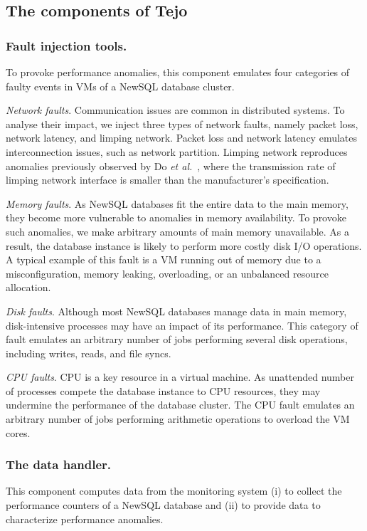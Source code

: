 \subsection{The components of Tejo}
\label{subsec:tejo_components}

\subsubsection{Fault injection tools.} 
To provoke performance anomalies, this component emulates four categories of faulty events in VMs of a NewSQL database cluster. 

\emph{Network faults}. Communication issues are common in distributed systems. To analyse their impact, we inject three types of network faults, namely packet loss, network latency, and limping network. Packet loss and network latency emulates interconnection issues, such as network partition. Limping network reproduces anomalies previously observed by Do \emph{et al.}~\cite{do2013limplock}, where the transmission rate of limping network interface is smaller than the manufacturer's specification. 

\emph{Memory faults}. As NewSQL databases fit the entire data to the main memory, they become more vulnerable to anomalies in memory availability. To provoke such anomalies, we make arbitrary amounts of main memory unavailable. As a result, the database instance is likely to perform more costly disk I/O operations. A typical example of this fault is a VM running out of memory due to a misconfiguration, memory leaking, overloading, or an unbalanced resource allocation.

\emph{Disk faults}. Although most NewSQL databases manage data in main memory, disk-intensive processes may have an impact of its performance. This category of fault emulates an arbitrary number of jobs performing several disk operations, including writes, reads, and file syncs.  

\emph{CPU faults}. CPU is a key resource in a virtual machine. As unattended number of processes compete the database instance to CPU resources, they may undermine the performance of the database cluster. The CPU fault emulates an arbitrary number of jobs performing arithmetic operations to overload the VM cores. 


\subsubsection{The data handler.} 
This component computes data from the monitoring system (i) to collect the performance counters of a NewSQL database and (ii) to provide data to characterize performance anomalies.

